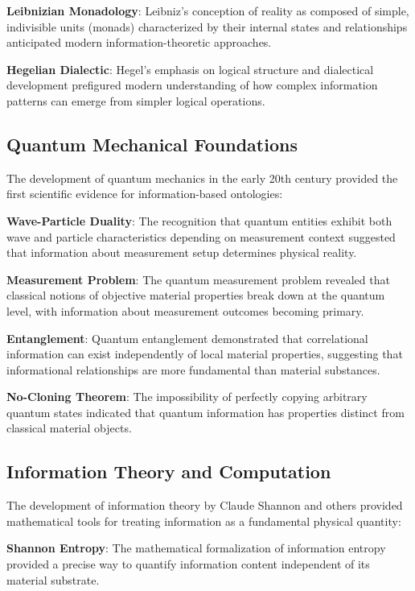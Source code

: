 \documentclass[12pt]{article}
\begin{document}
\textbf{Leibnizian Monadology}: Leibniz's conception of reality as composed of simple, indivisible units (monads) characterized by their internal states and relationships anticipated modern information-theoretic approaches.

\textbf{Hegelian Dialectic}: Hegel's emphasis on logical structure and dialectical development prefigured modern understanding of how complex information patterns can emerge from simpler logical operations.

\subsection{Quantum Mechanical Foundations}

The development of quantum mechanics in the early 20th century provided the first scientific evidence for information-based ontologies:

\textbf{Wave-Particle Duality}: The recognition that quantum entities exhibit both wave and particle characteristics depending on measurement context suggested that information about measurement setup determines physical reality.

\textbf{Measurement Problem}: The quantum measurement problem revealed that classical notions of objective material properties break down at the quantum level, with information about measurement outcomes becoming primary.

\textbf{Entanglement}: Quantum entanglement demonstrated that correlational information can exist independently of local material properties, suggesting that informational relationships are more fundamental than material substances.

\textbf{No-Cloning Theorem}: The impossibility of perfectly copying arbitrary quantum states indicated that quantum information has properties distinct from classical material objects.

\subsection{Information Theory and Computation}

The development of information theory by Claude Shannon and others provided mathematical tools for treating information as a fundamental physical quantity:

\textbf{Shannon Entropy}: The mathematical formalization of information entropy provided a precise way to quantify information content independent of its material substrate.
\end{document}
